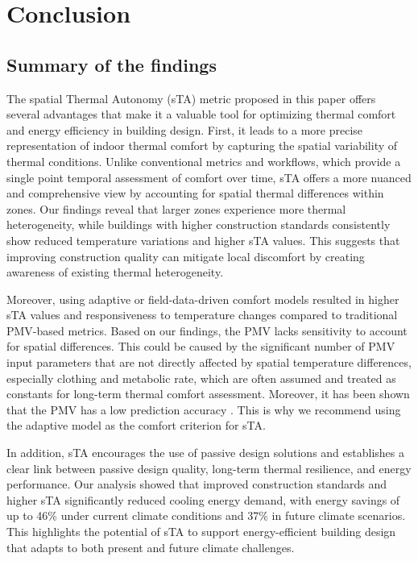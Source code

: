 

\section{Conclusion}

\subsection{Summary of the findings}

The spatial Thermal Autonomy (sTA) metric proposed in this paper offers several advantages that make it a valuable tool for optimizing thermal comfort and energy efficiency in building design. First, it leads to a more precise representation of indoor thermal comfort by capturing the spatial variability of thermal conditions. Unlike conventional metrics and workflows, which provide a single point temporal assessment of comfort over time, sTA offers a more nuanced and comprehensive view by accounting for spatial thermal differences within zones. Our findings reveal that larger zones experience more thermal heterogeneity, while buildings with higher construction standards consistently show reduced temperature variations and higher sTA values. This suggests that improving construction quality can mitigate local discomfort by creating awareness of existing thermal heterogeneity.

Moreover, using adaptive or field-data-driven comfort models resulted in higher sTA values and responsiveness to temperature changes compared to traditional PMV-based metrics. Based on our findings, the PMV lacks sensitivity to account for spatial differences. This could be caused by the significant number of PMV input parameters that are not directly affected by spatial temperature differences, especially clothing and metabolic rate, which are often assumed and treated as constants for long-term thermal comfort assessment. Moreover, it has been shown that the PMV has a low prediction accuracy \citep{cheung_analysis_2019}. This is why we recommend using the adaptive model as the comfort criterion for sTA.

In addition, sTA encourages the use of passive design solutions and establishes a clear link between passive design quality, long-term thermal resilience, and energy performance. Our analysis showed that improved construction standards and higher sTA significantly reduced cooling energy demand, with energy savings of up to 46\% under current climate conditions and 37\% in future climate scenarios. This highlights the potential of sTA to support energy-efficient building design that adapts to both present and future climate challenges. 

